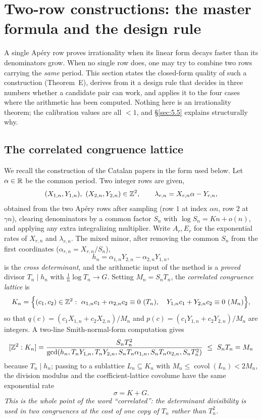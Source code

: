\section{Two-row constructions: the master formula and the design rule}
\label{sec:tworow}

A single Ap\'ery row proves irrationality when its linear form decays faster
than its denominators grow.  When no single row does, one may try to combine
two rows carrying the \emph{same} period.  This section states the closed-form
quality of such a construction (Theorem~E), derives from it a design rule that
decides in three numbers whether a candidate pair can work, and applies it to
the four cases where the arithmetic has been computed.  Nothing here is an
irrationality theorem; the calibration values are all $<1$, and \S\ref{sec:5.5}
explains structurally why.

\subsection{The correlated congruence lattice}\label{sec:5.1}

We recall the construction of the Catalan papers \cite{ProjCatalan58,
ProjCatalanWindow} in the form used below.  Let $\alpha\in\mathbb{R}$ be the common
period.  Two integer rows are given,
\[
(X_{1,n},Y_{1,n}),\ (X_{2,n},Y_{2,n})\in\Z^2,\qquad
\lambda_{r,n}=X_{r,n}\alpha-Y_{r,n},
\]
obtained from the two Ap\'ery rows after sampling (row $1$ at index $\alpha n$,
row $2$ at $\gamma n$), clearing denominators by a common factor $S_n$ with
$\log S_n=Kn+o(n)$, and applying any extra integralizing multiplier.  Write
$A_r,E_r$ for the exponential rates of $X_{r,n}$ and $\lambda_{r,n}$.  The
mixed minor, after removing the common $S_n$ from the first coordinates
($\alpha_{r,n}=X_{r,n}/S_n$),
\[
h_n=\alpha_{1,n}Y_{2,n}-\alpha_{2,n}Y_{1,n},
\]
is the \emph{cross determinant}, and the arithmetic input of the method is a
\emph{proved} divisor $T_n\mid h_n$ with $\tfrac1n\log T_n\to G$.  Setting
$M_n=S_nT_n$, the \emph{correlated congruence lattice} is
\begin{equation}\label{eq:Kn}
K_n=\Bigl\{(c_1,c_2)\in\mathbb{Z}^2:\
\alpha_{1,n}c_1+\alpha_{2,n}c_2\equiv0\ (T_n),\quad
Y_{1,n}c_1+Y_{2,n}c_2\equiv0\ (M_n)\Bigr\},
\end{equation}
so that $q(c)=(c_1X_{1,n}+c_2X_{2,n})/M_n$ and
$p(c)=(c_1Y_{1,n}+c_2Y_{2,n})/M_n$ are integers.  A two-line Smith-normal-form
computation gives
\[
[\mathbb{Z}^2:K_n]
=\frac{S_nT_n^2}{\gcd(h_n,T_nY_{1,n},T_nY_{2,n},S_nT_n\alpha_{1,n},
S_nT_n\alpha_{2,n},S_nT_n^2)}\ \le\ S_nT_n=M_n
\]
because $T_n\mid h_n$; passing to a sublattice $L_n\subseteq K_n$ with
$M_n\le\operatorname{covol}(L_n)<2M_n$, the division modulus and the
coefficient-lattice covolume have the same exponential rate
\begin{equation}\label{eq:sigma}
\sigma=K+G .
\end{equation}
\emph{This is the whole point of the word ``correlated'': the determinant
divisibility is used in two congruences at the cost of one copy of $T_n$
rather than $T_n^2$.}

